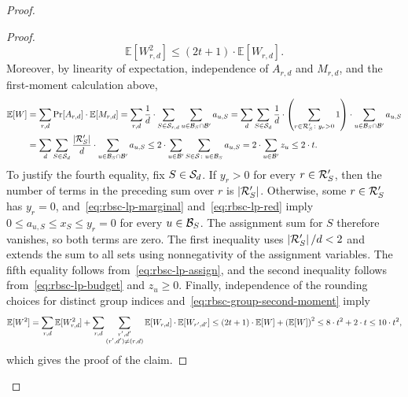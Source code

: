 \begin{proof}
\begin{proof}
\begin{equation}
 \mathbb{E}[W_{r,d}^2]\leq(2t+1)\cdot\mathbb{E}[W_{r,d}].
\end{equation}
Moreover, by linearity of expectation, independence of $A_{r,d}$ and $M_{r,d}$, and the first-moment calculation above,
\begingroup\small
\begin{align*}
 \mathbb{E}[W]
 &=\sum_{r,d}\Pr[A_{r,d}]\cdot\mathbb{E}[M_{r,d}]
 =\sum_{r,d}\frac1d\cdot\sum_{S\in\mathcal{S}_{r,d}}
       \sum_{u\in\mathcal{B}_S\cap\mathcal{B}'}a_{u,S}
 =\sum_d\sum_{S\in\mathcal{S}_d}\frac1d\cdot
       \mathopen{}\left( \sum_{r\in\mathcal{R}'_S\colon y_r>0}1 \right)\cdot\sum_{u\in\mathcal{B}_S\cap\mathcal{B}'}a_{u,S}\\
 &=\sum_d\sum_{S\in\mathcal{S}_d}\frac{\mathopen{}\left| \mathcal{R}'_S \right|}d\cdot
       \sum_{u\in\mathcal{B}_S\cap\mathcal{B}'}a_{u,S}
 \leq2\cdot\sum_{u\in\mathcal{B}'}\sum_{S\in\mathcal{S}\colon u\in\mathcal{B}_S}a_{u,S}
 =2\cdot\sum_{u\in\mathcal{B}'}z_u\leq2\cdot t.
\end{align*}
\endgroup
To justify the fourth equality, fix $S\in\mathcal{S}_d$. If $y_r>0$ for every $r\in\mathcal{R}'_S$, then the number of terms in the preceding sum over $r$ is $\mathopen{}\left| \mathcal{R}'_S \right|$. Otherwise, some $r\in\mathcal{R}'_S$ has $y_r=0$, and~\eqref{eq:rbsc-lp-marginal} and~\eqref{eq:rbsc-lp-red} imply $0\leq a_{u,S}\leq x_S\leq y_r=0$ for every $u\in\mathcal{B}_S$. The assignment sum for $S$ therefore vanishes, so both terms are zero. The first inequality uses $\mathopen{}\left| \mathcal{R}'_S \right|/d<2$ and extends the sum to all sets using nonnegativity of the assignment variables. The fifth equality follows from~\eqref{eq:rbsc-lp-assign}, and the second inequality follows from~\eqref{eq:rbsc-lp-budget} and $z_u\geq0$. Finally, independence of the rounding choices for distinct group indices and~\eqref{eq:rbsc-group-second-moment} imply
\[
 \mathbb{E}[W^2]
 =\sum_{r,d}\mathbb{E}[W_{r,d}^2]
   +\sum_{r,d}\sum_{\substack{r',d'\\(r',d')\ne(r,d)}}\mathbb{E}[W_{r,d}]\cdot\mathbb{E}[W_{r',d'}]
 \leq(2t+1)\cdot\mathbb{E}[W]+\mathopen{}\left( \mathbb{E}[W] \right)^2
 \leq8\cdot t^2+2\cdot t\leq10\cdot t^2,
\]
which gives the proof of the claim.
\end{proof}


\end{proof}
